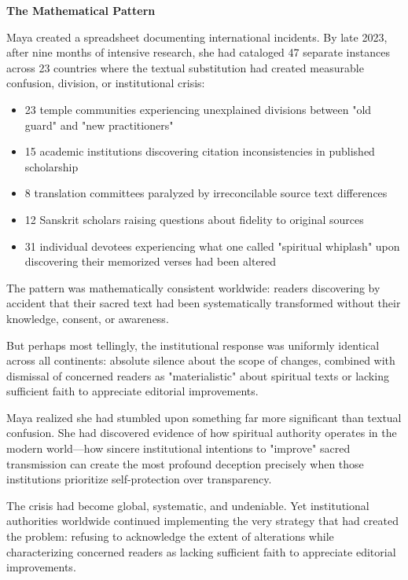 \documentclass[12pt,twoside]{book}
\makeatletter
\def\cleardoublepage{\clearpage\if@twoside \ifodd\c@page\else\hbox{}\thispagestyle{empty}\newpage\if@twocolumn\hbox{}\newpage\fi\fi\fi}
\makeatother
\begin{document}
\textbf{\textbf{The Mathematical Pattern}}

Maya created a spreadsheet documenting international incidents. By late 2023, after nine months of intensive research, she had cataloged 47 separate instances across 23 countries where the textual substitution had created measurable confusion, division, or institutional crisis:

\begin{itemize}
\item 23 temple communities experiencing unexplained divisions between "old guard" and "new practitioners"
\item 15 academic institutions discovering citation inconsistencies in published scholarship
\item 8 translation committees paralyzed by irreconcilable source text differences
\item 12 Sanskrit scholars raising questions about fidelity to original sources
\item 31 individual devotees experiencing what one called "spiritual whiplash" upon discovering their memorized verses had been altered
\end{itemize}

The pattern was mathematically consistent worldwide: readers discovering by accident that their sacred text had been systematically transformed without their knowledge, consent, or awareness.

But perhaps most tellingly, the institutional response was uniformly identical across all continents: absolute silence about the scope of changes, combined with dismissal of concerned readers as "materialistic" about spiritual texts or lacking sufficient faith to appreciate editorial improvements.

Maya realized she had stumbled upon something far more significant than textual confusion. She had discovered evidence of how spiritual authority operates in the modern world—how sincere institutional intentions to "improve" sacred transmission can create the most profound deception precisely when those institutions prioritize self-protection over transparency.

The crisis had become global, systematic, and undeniable. Yet institutional authorities worldwide continued implementing the very strategy that had created the problem: refusing to acknowledge the extent of alterations while characterizing concerned readers as lacking sufficient faith to appreciate editorial improvements.

\cleardoublepage
\vspace*{0.20\textheight}
\end{document}

